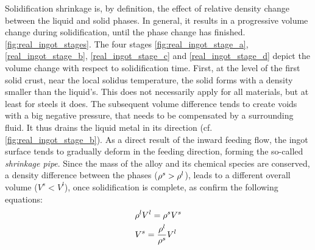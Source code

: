 Solidification shrinkage is, by definition, the effect of relative density change between the liquid and solid phases.
In general, it results in a progressive volume change during solidification, until the phase change has finished. \autoref{fig:real_ingot_stages}. The four stages \autoref{fig:real_ingot_stage_a}, \autoref{real_ingot_stage_b}, \autoref{real_ingot_stage_c} and \autoref{real_ingot_stage_d} 
depict the volume change with respect to solidification time.
First, at the level of the first solid crust, near the local solidus temperature, the solid forms with a density smaller than 
the liquid's. This does not necessarily apply for all materials, but at least for steels it does. The subsequent volume difference 
tends to create voids with a big negative pressure, that needs to be compensated by a surrounding fluid. It thus drains 
the liquid metal in its direction (cf. \autoref{fig:real_ingot_stage_b}). As a direct result of the inward feeding flow, the ingot surface
tends to gradually deform in the feeding direction, forming the so-called \emph{shrinkage pipe}. Since the mass of the alloy and its 
chemical species are conserved, a density difference between the phases ($\rho^s > \rho^l$), leads to a different overall 
volume ($V^s<V^l$), once solidification is complete, as confirm the following equations:
\begin{subequations}
\begin{align}
& \rho^l V^l = \rho^s V^s  \\ 
& V^s = \frac{\rho^l}{\rho^s} V^l
\end{align}
\end{subequations}
%
%
%
%
%
% 

